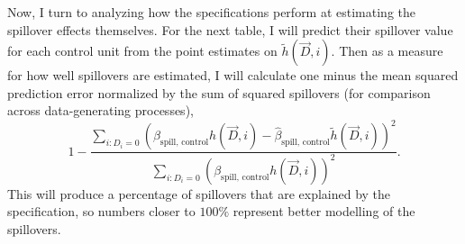 \documentclass[11pt]{article}
\begin{document}
Now, I turn to analyzing how the specifications perform at estimating the spillover effects themselves. For the next table, I will predict their spillover value for each control unit from the point estimates on $\tilde{h}(\vec{D}, i)$. Then as a measure for how well spillovers are estimated, I will calculate one minus the mean squared prediction error normalized by the sum of squared spillovers (for comparison across data-generating processes), \[ 
    1 - \frac{\sum_{i: D_i = 0} (\beta_{\text{spill, control}} h(\vec{D}, i) - \hat{\beta}_{\text{spill, control}} \tilde{h}(\vec{D}, i))^2}{\sum_{i: D_i = 0} (\beta_{\text{spill, control}} h(\vec{D}, i))^2}.
\] This will produce a percentage of spillovers that are explained by the specification, so numbers closer to $100\%$ represent better modelling of the spillovers. 
\end{document}
